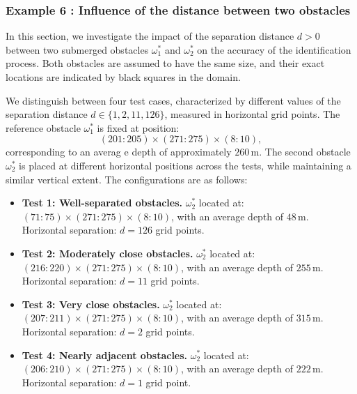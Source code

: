 \documentclass[a4paper,12pt,reqno,natbib]{amsart}
\begin{document}
\subsubsection{Example 6 : Influence of the distance between two obstacles}\label{example6}

In this section, we investigate the impact of the separation distance \( d > 0 \) between two submerged obstacles \( \omega^*_1 \) and \( \omega^*_2 \) on the accuracy of the identification process. Both obstacles are assumed to have the same size, and their exact locations are indicated by black squares in the domain.

We distinguish between four test cases, characterized by different values of the separation distance \( d \in \{1, 2, 11, 126\} \), measured in horizontal grid points. The reference obstacle \( \omega^*_1 \) is fixed at position:
\[
(201{:}205) \times (271{:}275) \times (8{:}10),
\]
corresponding to an averag
e depth of approximately \( 260\,\mathrm{m} \). The second obstacle \( \omega^*_2 \) is placed at different horizontal positions across the tests, while maintaining a similar vertical extent. The configurations are as follows:

\begin{itemize}
    \item \textbf{Test 1: Well-separated obstacles.}
\( \omega^*_2 \) located at: \( (71{:}75) \times (271{:}275) \times (8{:}10) \), with an average depth of \( 48\,\mathrm{m} \). Horizontal separation: \( d = 126 \) grid points.

    \item \textbf{Test 2: Moderately close obstacles.} \( \omega^*_2 \) located at: \( (216{:}220) \times (271{:}275) \times (8{:}10) \), with an average depth of \( 255\,\mathrm{m} \).
    Horizontal separation: \( d = 11 \) grid points.

    \item \textbf{Test 3: Very close obstacles.}
    \( \omega^*_2 \) located at: \( (207{:}211) \times (271{:}275) \times (8{:}10) \), with an average depth of \( 315\,\mathrm{m} \).
    Horizontal separation: \( d = 2 \) grid points.

    \item \textbf{Test 4: Nearly adjacent obstacles.}
    \( \omega^*_2 \) located at: \( (206{:}210) \times (271{:}275) \times (8{:}10) \), with an average depth of \( 222\,\mathrm{m} \).
    Horizontal separation: \( d = 1 \) grid point.
\end{itemize}
\end{document}

